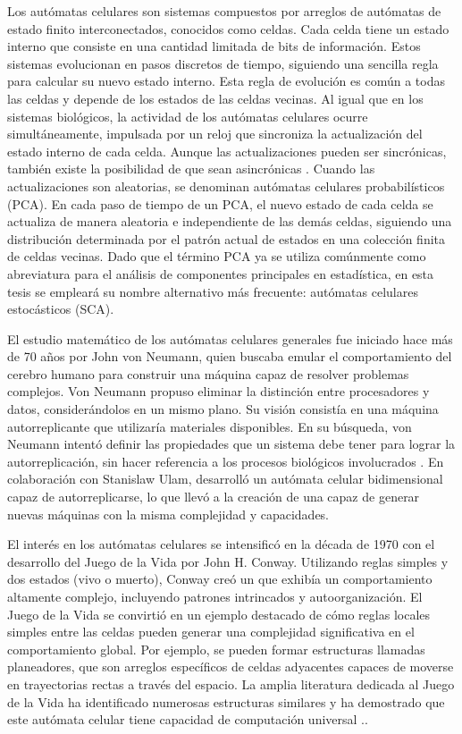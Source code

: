 Los autómatas celulares son sistemas compuestos por arreglos de autómatas de estado finito interconectados, conocidos como celdas. Cada celda tiene un estado interno que consiste en una cantidad limitada de bits de información. Estos sistemas evolucionan en pasos discretos de tiempo, siguiendo una sencilla regla para calcular su nuevo estado interno. Esta regla de evolución es común a todas las celdas y depende de los estados de las celdas vecinas. Al igual que en los sistemas biológicos, la actividad de los autómatas celulares ocurre simultáneamente, impulsada por un reloj que sincroniza la actualización del estado interno de cada celda. Aunque las actualizaciones pueden ser sincrónicas, también existe la posibilidad de que sean asincrónicas \cite{louis_probabilistic_2018}. Cuando las actualizaciones son aleatorias, se denominan autómatas celulares probabilísticos (PCA). En cada paso de tiempo de un PCA, el nuevo estado de cada celda se actualiza de manera aleatoria e independiente de las demás celdas, siguiendo una distribución determinada por el patrón actual de estados en una colección finita de celdas vecinas. Dado que el término PCA ya se utiliza comúnmente como abreviatura para el análisis de componentes principales en estadística, en esta tesis se empleará su nombre alternativo más frecuente: autómatas celulares estocásticos (SCA).



El estudio matemático de los autómatas celulares generales fue iniciado hace más de 70 años por John von Neumann, quien buscaba emular el comportamiento del cerebro humano para construir una máquina capaz de resolver problemas complejos. Von Neumann propuso eliminar la distinción entre procesadores y datos, considerándolos en un mismo plano. Su visión consistía en una máquina autorreplicante que utilizaría materiales disponibles. En su búsqueda, von Neumann intentó definir las propiedades que un sistema debe tener para lograr la autorreplicación, sin hacer referencia a los procesos biológicos involucrados \cite{chopard_cellular_1998}. En colaboración con Stanislaw Ulam, desarrolló un autómata celular bidimensional capaz de autorreplicarse, lo que llevó a la creación de una  capaz de generar nuevas máquinas con la misma complejidad y capacidades.

El interés en los autómatas celulares se intensificó en la década de 1970 con el desarrollo del Juego de la Vida por John H. Conway. Utilizando reglas simples y dos estados (vivo o muerto), Conway creó un  que exhibía un comportamiento altamente complejo, incluyendo patrones intrincados y autoorganización. El Juego de la Vida se convirtió en un ejemplo destacado de cómo reglas locales simples entre las celdas pueden generar una complejidad significativa en el comportamiento global. Por ejemplo, se pueden formar estructuras llamadas planeadores, que son arreglos específicos de celdas adyacentes capaces de moverse en trayectorias rectas a través del espacio. La amplia literatura dedicada al Juego de la Vida ha identificado numerosas estructuras similares y ha demostrado que este autómata celular tiene capacidad de computación universal \cite{gardner_mathematical_1970}..



